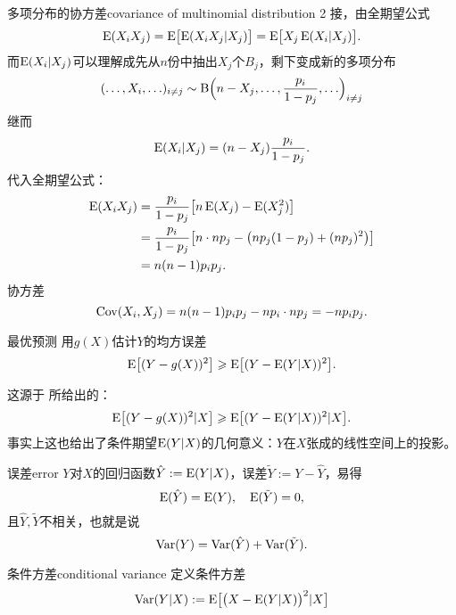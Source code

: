 \begin{example}{多项分布的协方差}{covariance of multinomial distribution 2}
	接，由全期望公式
	\[
		\operatorname{E}(X_iX_j)=\operatorname{E}\bigl[\operatorname{E}(X_iX_j|X_j)\bigr]=\operatorname{E}\bigl[X_j\operatorname{E}(X_i|X_j)\bigr].
	\]
	而$\operatorname{E}(X_i|X_j)$可以理解成先从$n$份中抽出$X_j$个$B_j$，剩下变成新的多项分布
	\[
		(\ldots,X_i,\ldots)_{i\neq j}\sim\operatorname{B}\Bigl(n-X_j,\ldots,\frac{p_i}{1-p_j},\ldots\Bigr)_{i\neq j}
	\]
	继而
	\[
		\operatorname{E}(X_i|X_j)=(n-X_j)\frac{p_i}{1-p_j}.
	\]
	代入全期望公式：
	\begin{align*}
		\operatorname{E}(X_iX_j)&=\frac{p_i}{1-p_j}\bigl[n\operatorname{E}(X_j)-\operatorname{E}(X_j^2)\bigr]\\
		&=\frac{p_i}{1-p_j}\bigl[n\cdot np_j-\bigl(np_j(1-p_j)+(np_j)^2\bigr)\bigr]\\
		&=n(n-1)p_ip_j.
	\end{align*}
	协方差
	\[
		\operatorname{Cov}(X_i,X_j)=n(n-1)p_ip_j-np_i\cdot np_j=-np_ip_j.
	\]
\end{example}
\begin{theorem}{最优预测}{}
	用$g(X)$估计$Y$的均方误差
	\begin{equation}
		\operatorname{E}\bigl[(Y-g(X))^2\bigr]\geqslant\operatorname{E}\bigl[(Y-\operatorname{E}(Y|X))^2\bigr].
	\end{equation}
\end{theorem}
这源于 所给出的：
\[
	\operatorname{E}\bigl[(Y-g(X))^2|X\bigr]\geqslant\operatorname{E}\bigl[(Y-\operatorname{E}(Y|X))^2|X\bigr].
\]
事实上这也给出了条件期望$\operatorname{E}(Y|X)$的几何意义：$Y$在$X$张成的线性空间上的投影。
\begin{example}{误差}{error}
	$Y$对$X$的回归函数$\hat Y:=\operatorname{E}(Y|X)$，误差$\tilde Y:=Y-\hat Y$，易得
	\[
		\operatorname{E}(\hat Y)=\operatorname{E}(Y),\quad\operatorname{E}(\tilde Y)=0,
	\]
	且$\hat Y,\tilde Y$不相关，也就是说
	\[
		\operatorname{Var}(Y)=\operatorname{Var}(\hat Y)+\operatorname{Var}(\tilde Y).
	\]
	\begin{center}
	\end{center}
\end{example}
\begin{definition}{条件方差}{conditional variance}
	定义条件方差
	\begin{equation}
		\operatorname{Var}(Y|X):=\operatorname{E}\bigl[\bigl(X-\operatorname{E}(Y|X)\bigr)^2|X\bigr]
	\end{equation}
\end{definition}
